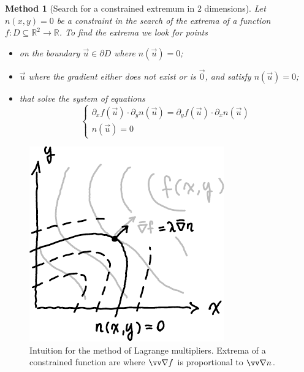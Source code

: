 \documentclass[twocolumn, margin=normal]{tex/hsrzf}
\theoremstyle{fuvarzf}
\newtheorem{method}{Method}
\begin{document}
\begin{method}[Search for a constrained extremum in 2 dimensions]
  Let \(n(x,y) = 0\) be a constraint in the search of the extrema of a function
  \(f: D \subseteq \mathbb{R}^2 \to \mathbb{R}\). To find the extrema we look for
  points
  \begin{itemize}
    \item on the boundary \(\vec{u} \in \partial D\) where \(n(\vec{u}) = 0\);

    \item \(\vec{u}\) where the gradient either does not exist or is
      \(\vec{0}\), and satisfy \(n(\vec{u}) = 0\);

    \item that solve the system of equations
      \[
        \begin{cases}
          \partial_x f(\vec{u}) \cdot \partial_y n(\vec{u})
            = \partial_y f(\vec{u}) \cdot \partial_x n(\vec{u}) \\
          n(\vec{u}) = 0
        \end{cases}
      \]
  \end{itemize}
\end{method}

\begin{figure}
  \centering
  \includegraphics{img/lagrange-multipliers}
  \caption{
    Intuition for the method of Lagrange multipliers.  Extrema of a constrained
    function are where \(\grad f\) is proportional to \(\grad n\).
  }
\end{figure}
\end{document}
